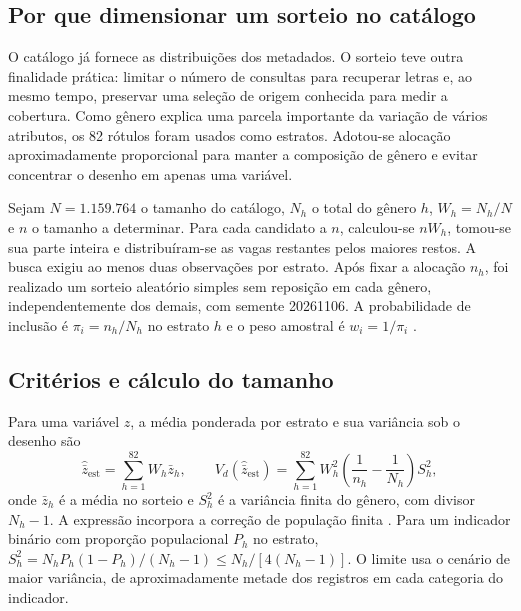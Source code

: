 \subsection{Por que dimensionar um sorteio no catálogo}
O catálogo já fornece as distribuições dos metadados. O sorteio teve outra finalidade prática: limitar o número de consultas para recuperar letras e, ao mesmo tempo, preservar uma seleção de origem conhecida para medir a cobertura. Como gênero explica uma parcela importante da variação de vários atributos, os 82 rótulos foram usados como estratos. Adotou-se alocação aproximadamente proporcional para manter a composição de gênero e evitar concentrar o desenho em apenas uma variável.

Sejam $N=1.159.764$ o tamanho do catálogo, $N_h$ o total do gênero $h$, $W_h=N_h/N$ e $n$ o tamanho a determinar. Para cada candidato a $n$, calculou-se $nW_h$, tomou-se sua parte inteira e distribuíram-se as vagas restantes pelos maiores restos. A busca exigiu ao menos duas observações por estrato. Após fixar a alocação $n_h$, foi realizado um sorteio aleatório simples sem reposição em cada gênero, independentemente dos demais, com semente 20261106. A probabilidade de inclusão é $\pi_i=n_h/N_h$ no estrato $h$ e o peso amostral é $w_i=1/\pi_i$ \cite{cochran1977,lohr2022,statcan2010}.

\subsection{Critérios e cálculo do tamanho}
Para uma variável $z$, a média ponderada por estrato e sua variância sob o desenho são
\begin{equation}
\widehat{\bar z}_{\mathrm{est}}=\sum_{h=1}^{82}W_h\bar z_h,\qquad
V_d(\widehat{\bar z}_{\mathrm{est}})=
\sum_{h=1}^{82}W_h^2\left(\frac{1}{n_h}-\frac{1}{N_h}\right)S_h^2,
\label{eq:desenho}
\end{equation}
onde $\bar z_h$ é a média no sorteio e $S_h^2$ é a variância finita do gênero, com divisor $N_h-1$. A expressão incorpora a correção de população finita \cite{cochran1977,lohr2022}. Para um indicador binário com proporção populacional $P_h$ no estrato, $S_h^2=N_h P_h(1-P_h)/(N_h-1)\leq N_h/[4(N_h-1)]$. O limite usa o cenário de maior variância, de aproximadamente metade dos registros em cada categoria do indicador.

